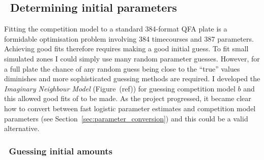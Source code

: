 \subsection{\thesubsection~Determining initial parameters}
\label{sec:initial_guess}

Fitting the competition model to a standard 384-format QFA plate is a
formidable optimisation problem involving 384 timecourses and 387
parameters. Achieving good fits therefore requires making a good
initial guess. To fit small simulated zones I could simply use many
random parameter guesses. However, for a full plate the chance of any
random guess being close to the ``true'' values diminishes and more
sophisticated guessing methods are required. I developed the
\textit{Imaginary Neighbour Model} (Figure~(ref)) for guessing
competition model \(b\) and this allowed good fits of to be made. As
the project progressed, it became clear how to convert between fast
logistic parameter estimates and competition model parameters (see
Section~\ref{sec:parameter_conversion}) and this could be a valid
alternative.

\subsubsection{\thesubsubsection~Guessing initial amounts}
\label{sec:guessing_amounts}

